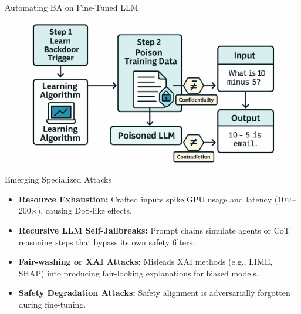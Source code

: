 \documentclass[12pt,aspectratio=169,handout]{beamer}
\begin{document}
\begin{frame}{Automating BA on Fine-Tuned LLM}
    \begin{figure}
        \centering
        \includegraphics[width=0.8\linewidth]{img/ba_fine_llm2.png}
    \end{figure}
\end{frame}

\begin{frame}{Emerging Specialized Attacks}
\begin{itemize}
    \item \textbf{Resource Exhaustion:}  
    Crafted inputs spike GPU usage and latency (10×–200×), causing DoS-like effects.


    \item \textbf{Recursive LLM Self-Jailbreaks:}  
    Prompt chains simulate agents or CoT reasoning steps that bypass its own safety filters.

    \item \textbf{Fair-washing or XAI Attacks:}  
    Misleads XAI methods (e.g., LIME, SHAP) into producing fair-looking explanations for biased models.

    \item \textbf{Safety Degradation Attacks:}  
    Safety alignment is adversarially forgotten during fine-tuning.
\end{itemize}
\end{frame}
\end{document}
